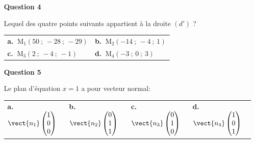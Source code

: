 \medskip

\textbf{Question 4}

Lequel des quatre points suivants appartient à la droite $\left(d'\right)$ ?

\begin{center}
\begin{tabularx}{\linewidth}{*{2}{X}}
\textbf{a.~}M$_1(50~;~-28~;~-29)$&\textbf{b.~}M$_2(-14~;~-4~;~1)$\\
\textbf{c.~}M$_3(2~;~-4~;~-1)$& \textbf{d.~}M$_4 (-3~;~0~;~3)$
\end{tabularx}
\end{center}

\medskip

\textbf{Question 5}

Le plan d'équation $x = 1$ a pour vecteur normal:

\begin{center}
\begin{tabularx}{\linewidth}{*{4}{X}}
\textbf{a.~} $\vect{n_1}\begin{pmatrix}1\\0\\0\end{pmatrix}$&
\textbf{b.~} $\vect{n_2}\begin{pmatrix}0\\1\\1\end{pmatrix}$&
\textbf{c.~} $\vect{n_3}\begin{pmatrix}0\\1\\0\end{pmatrix}$&
\textbf{d.~} $\vect{n_4}\begin{pmatrix}1\\0\\1\end{pmatrix}$
\end{tabularx}
\end{center}
